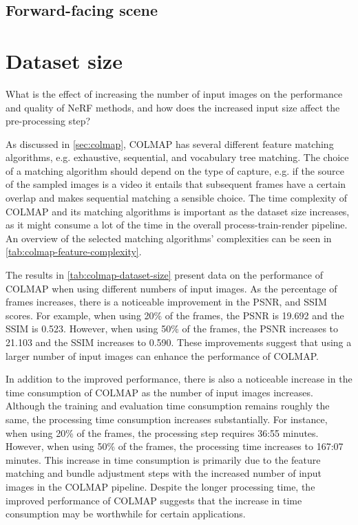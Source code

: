 \subsection{Forward-facing scene}



\section{Dataset size}
\begin{description}[leftmargin=!,labelwidth=\widthof{RQ 1:}]
\item[\textbf{RQ 2:}]
What is the effect of increasing the number of input images on the performance and quality of NeRF methods, and how does the increased input size affect the pre-processing step?
\end{description}

As discussed in \autoref{sec:colmap}, COLMAP has several different feature matching algorithms, e.g. exhaustive, sequential, and vocabulary tree matching. The choice of a matching algorithm should depend on the type of capture, e.g. if the source of the sampled images is a video it entails that subsequent frames have a certain overlap and makes sequential matching a sensible choice. The time complexity of COLMAP and its matching algorithms is important as the dataset size increases, as it might consume a lot of the time in the overall process-train-render pipeline. An overview of the selected matching algorithms' complexities can be seen in \autoref{tab:colmap-feature-complexity}.

The results in \autoref{tab:colmap-dataset-size} present data on the performance of COLMAP when using different numbers of input images. As the percentage of frames increases, there is a noticeable improvement in the PSNR, and SSIM scores. For example, when using 20\% of the frames, the PSNR is 19.692 and the SSIM is 0.523. However, when using 50\% of the frames, the PSNR increases to 21.103 and the SSIM increases to 0.590. These improvements suggest that using a larger number of input images can enhance the performance of COLMAP.

In addition to the improved performance, there is also a noticeable increase in the time consumption of COLMAP as the number of input images increases. Although the training and evaluation time consumption remains roughly the same, the processing time consumption increases substantially. For instance, when using 20\% of the frames, the processing step requires 36:55 minutes. However, when using 50\% of the frames, the processing time increases to 167:07 minutes. This increase in time consumption is primarily due to the feature matching and bundle adjustment steps with the increased number of input images in the COLMAP pipeline. Despite the longer processing time, the improved performance of COLMAP suggests that the increase in time consumption may be worthwhile for certain applications.

